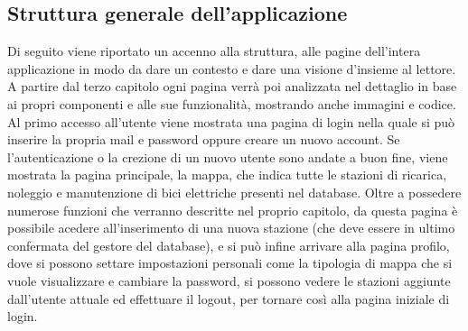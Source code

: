 	\subsection{Struttura generale dell'applicazione}
	Di seguito viene riportato un accenno alla struttura, alle pagine
	dell'intera applicazione in modo da dare un contesto e dare una visione
	d'insieme al lettore. A partire dal terzo capitolo ogni pagina verrà poi
	analizzata nel dettaglio in base ai propri componenti e alle sue
	funzionalità, mostrando anche immagini e codice. \newline
	Al primo accesso all'utente viene mostrata una pagina di login nella quale
	si può inserire la propria mail e password oppure creare un nuovo account.
	Se l'autenticazione o la crezione di un nuovo utente sono andate a buon
	fine, viene mostrata la pagina principale, la mappa, che indica tutte le
	stazioni di ricarica, noleggio e manutenzione di bici elettriche presenti
	nel database. Oltre a possedere numerose funzioni che verranno descritte nel
	proprio capitolo, da questa pagina è possibile acedere all'inserimento di
	una nuova stazione (che deve essere in ultimo confermata del gestore del
	database), e si può infine arrivare alla pagina profilo, dove si possono
	settare impostazioni personali come la tipologia di mappa che si vuole
	visualizzare e cambiare la password, si possono vedere le stazioni aggiunte
	dall'utente attuale ed effettuare il logout, per tornare così alla pagina
	iniziale di login. 	
	
%